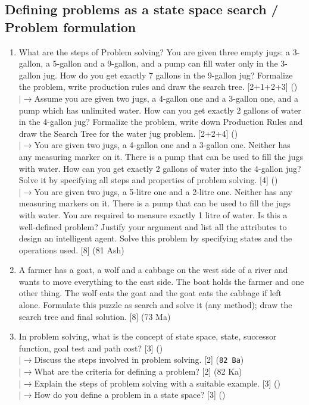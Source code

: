 \documentclass[12pt]{article}
\newcommand{\lb}{\\$\left|\rightarrow\right.$}
\begin{document}
  \subsection{Defining problems as a state space search / Problem formulation}
    \begin{enumerate}[topsep=0pt, noitemsep]
      \item What are the steps of Problem solving? You are given three empty jugs: a 3-gallon, a 5-gallon and a 9-gallon, and a pump can fill water only in the 3-gallon jug. How do you get exactly 7 gallons in the 9-gallon jug? Formalize the problem, write production rules and draw the search tree. \hfill [2+1+2+3] ()
        \lb Assume you are given two jugs, a 4-gallon one and a 3-gallon one, and a pump which has unlimited water. How can you get exactly 2 gallons of water in the 4-gallon jug? Formalize the problem, write down Production Rules and draw the Search Tree for the water jug problem. \hfill [2+2+4] ()
        \lb You are given two jugs, a 4-gallon one and a 3-gallon one. Neither has any measuring marker on it. There is a pump that can be used to fill the jugs with water. How can you get exactly 2 gallons of water into the 4-gallon jug? Solve it by specifying all steps and properties of problem solving. \hfill [4] ()
        \lb You are given two jugs, a 5-litre one and a 2-litre one. Neither has any measuring markers on it. There is a pump that can be used to fill the jugs with water. You are required to measure exactly 1 litre of water. Is this a well-defined problem? Justify your argument and list all the attributes to design an intelligent agent. Solve this problem by specifying states and the operations used. \hfill [8] (81 Ash)

      \item A farmer has a goat, a wolf and a cabbage on the west side of a river and wants to move everything to the east side. The boat holds the farmer and one other thing. The wolf eats the goat and the goat eats the cabbage if left alone. Formulate this puzzle as search and solve it (any method); draw the search tree and final solution. \hfill [8] (73 Ma)

      \item In problem solving, what is the concept of state space, state, successor function, goal test and path cost? \hfill [3] ()
        \lb Discuss the steps involved in problem solving. \hfill [2] (\texttt{82 Ba})
        \lb What are the criteria for defining a problem? \hfill [2] (82 Ka)
        \lb Explain the steps of problem solving with a suitable example. \hfill [3] ()
        \lb How do you define a problem in a state space? \hfill [3] ()
    \end{enumerate}
\end{document}
